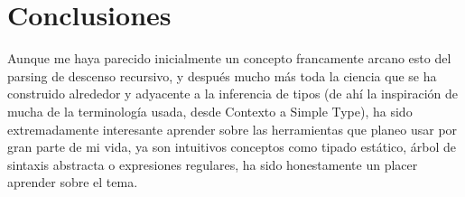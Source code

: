 \documentclass{article}
\begin{document}
\newpage

\section*{Conclusiones}
Aunque me haya parecido inicialmente un concepto francamente arcano esto del parsing de descenso recursivo, y después mucho más toda la ciencia que se ha construido alrededor y adyacente a la inferencia de tipos (de ahí la inspiración de mucha de la terminología usada, desde Contexto a Simple Type), ha sido extremadamente interesante aprender sobre las herramientas que planeo usar por gran parte de mi vida, ya son intuitivos conceptos como tipado estático, árbol de sintaxis abstracta o expresiones regulares, ha sido honestamente un placer aprender sobre el tema.
\end{document}
